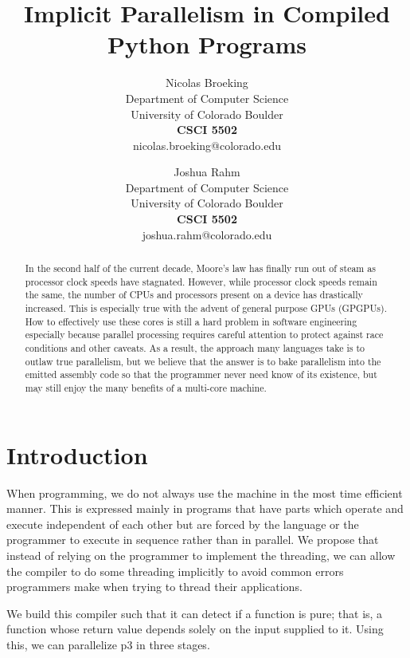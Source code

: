\documentclass{acm_proc_article-sp}
\title{Implicit Parallelism in Compiled Python Programs}
\author{
    Nicolas Broeking \\
    \small Department of Computer Science \\
    \small University of Colorado Boulder \\
    \small \textbf{CSCI 5502} \\
    \small nicolas.broeking@colorado.edu \\
    \and
    Joshua Rahm \\
    \small Department of Computer Science \\
    \small University of Colorado Boulder \\
    \small \textbf{CSCI 5502} \\
    \small joshua.rahm@colorado.edu \\
}
\begin{document}

\maketitle

\begin{abstract}

In the second half of the current decade, Moore's law has
finally run out of steam as processor clock speeds have stagnated. However,
while processor clock speeds remain the same, the number of CPUs and processors
present on a device has drastically increased.  This is especially true with
the advent of general purpose GPUs (GPGPUs). How to effectively use these cores
is still a hard problem in software engineering especially because parallel
processing requires careful attention to protect against race conditions and
other caveats.  As a result, the approach many languages take is to outlaw true
parallelism, but we believe that the answer is to bake parallelism into the emitted
assembly code so that the programmer never need know of its existence, but may still
enjoy the many benefits of a multi-core machine.

\end{abstract}

\section*{Introduction}
When programming, we do not always use the machine in the most time efficient manner.
This is expressed mainly in programs that have parts which operate and execute independent
of each other but are forced by the language or the programmer to execute in sequence rather
than in parallel. We propose that instead of relying on the programmer to implement the threading,
we can allow the compiler to do some threading implicitly to avoid common errors programmers make
when trying to thread their applications.

We build this compiler such that it can detect if a function is pure; that is, a function
whose return value depends solely on the input supplied to it. Using this, we can parallelize
p3 in three stages.
\end{document}
